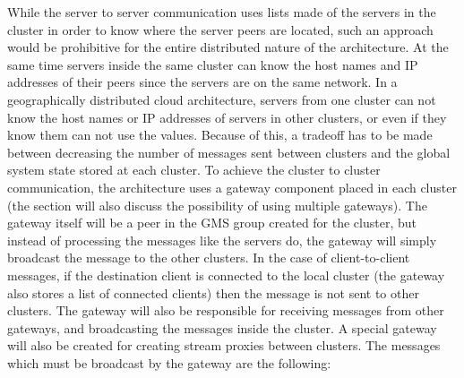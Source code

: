While the server to server communication uses lists made of the servers in the cluster in order to know where the server peers are located, such an approach would be prohibitive for the entire distributed nature of the architecture. At the same time servers inside the same cluster can know the host names and IP addresses of their peers since the servers are on the same network. In a geographically distributed cloud architecture, servers from one cluster can not know the host names or IP addresses of servers in other clusters, or even if they know them can not use the values. Because of this, a tradeoff has to be made between decreasing the number of messages sent between clusters and the global system state stored at each cluster. To achieve the cluster to cluster communication, the architecture uses a gateway component placed in each cluster (the section will also discuss the possibility of using multiple gateways). The gateway itself will be a peer in the GMS group created for the cluster, but instead of processing the messages like the servers do, the gateway will simply broadcast the message to the other clusters. In the case of client-to-client messages, if the destination client is connected to the local cluster (the gateway also stores a list of connected clients) then the message is not sent to other clusters. The gateway will also be responsible for receiving messages from other gateways, and broadcasting the messages inside the cluster. A special gateway will also be created for creating stream proxies between clusters. The messages which must be broadcast by the gateway are the following:

